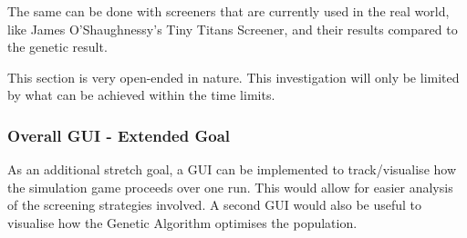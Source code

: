 The same can be done with screeners that are currently used in the real world, like James O'Shaughnessy’s Tiny Titans Screener, and their results compared to the genetic result. \newline

This section is very open-ended in nature. This investigation will only be limited by what can be achieved within the time limits.

\subsubsection{Overall GUI - Extended Goal}
As an additional stretch goal, a GUI can be implemented to track/visualise how the simulation game proceeds over one run. This would allow for easier analysis of the screening strategies involved. A second GUI would also be useful to visualise how the Genetic Algorithm optimises the population.

